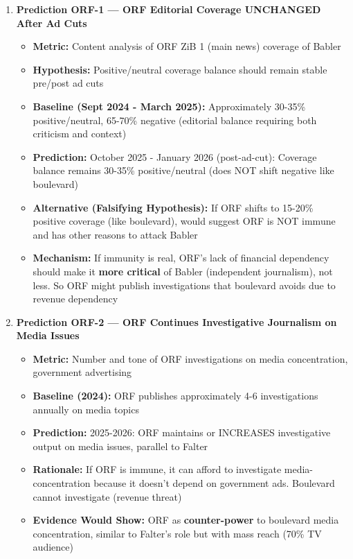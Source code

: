 \begin{enumerate}

\item \textbf{Prediction ORF-1 — ORF Editorial Coverage UNCHANGED After Ad Cuts}
  \begin{itemize}
  \item \textbf{Metric:} Content analysis of ORF ZiB 1 (main news) coverage of Babler
  \item \textbf{Hypothesis:} Positive/neutral coverage balance should remain stable pre/post ad cuts
  \item \textbf{Baseline (Sept 2024 - March 2025):} Approximately 30-35\% positive/neutral, 65-70\% negative
    (editorial balance requiring both criticism and context)
  \item \textbf{Prediction:} October 2025 - January 2026 (post-ad-cut): Coverage balance remains 30-35\%
    positive/neutral (does NOT shift negative like boulevard)
  \item \textbf{Alternative (Falsifying Hypothesis):} If ORF shifts to 15-20\% positive coverage (like boulevard),
    would suggest ORF is NOT immune and has other reasons to attack Babler
  \item \textbf{Mechanism:} If immunity is real, ORF's lack of financial dependency should make it
    \textbf{more critical} of Babler (independent journalism), not less. So ORF might publish investigations
    that boulevard avoids due to revenue dependency
  \end{itemize}

\item \textbf{Prediction ORF-2 — ORF Continues Investigative Journalism on Media Issues}
  \begin{itemize}
  \item \textbf{Metric:} Number and tone of ORF investigations on media concentration, government advertising
  \item \textbf{Baseline (2024):} ORF publishes approximately 4-6 investigations annually on media topics
  \item \textbf{Prediction:} 2025-2026: ORF maintains or INCREASES investigative output on media issues,
    parallel to Falter
  \item \textbf{Rationale:} If ORF is immune, it can afford to investigate media-concentration because it
    doesn't depend on government ads. Boulevard cannot investigate (revenue threat)
  \item \textbf{Evidence Would Show:} ORF as \textbf{counter-power} to boulevard media concentration,
    similar to Falter's role but with mass reach (70\% TV audience)
  \end{itemize}


\end{enumerate}
